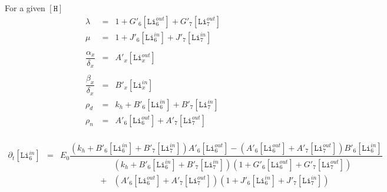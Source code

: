 \documentclass[aps,onecolumn,11pt]{revtex4}
\newcommand{\mychem}[1]{\mathtt{#1}}
\newcommand{\myconc}[1]{\left\lbrack{#1}\right\rbrack}
\newcommand{\LiIn}[1]{\myconc{\mychem{Li}_{#1}^{in}}}
\newcommand{\LiOut}[1]{\myconc{\mychem{Li}_{#1}^{out}}}
\newcommand{\Hin}{\myconc{\mychem{H}}}
\begin{document}
For a given $\Hin$
\begin{equation}
	\begin{array}{rcl}
	\lambda & = & 1 + G'_6 \LiOut{6} + G'_7 \LiOut{7} \\
	\mu     & = & 1 + J'_6 \LiIn{6} + J'_7 \LiIn{7} \\
	\\
	\dfrac{\alpha_x}{\delta_x} & = & A'_x \LiOut{x}\\
	\\
	\dfrac{\beta_x}{\delta_x}  & = & B'_x \LiIn{x}\\
	\rho_d & = & k_h + B'_6 \LiIn{6} + B'_7 \LiIn{7}\\
	\rho_n & = & A'_6 \LiOut{6} + A'_7 \LiOut{7}\\
	\end{array}
\end{equation}

\begin{equation}
	\begin{array}{rcl}
	\partial_t \LiIn{6} & = &E_0
	\dfrac{
	 \left(k_h + B'_6 \LiIn{6} + B'_7 \LiIn{7}\right) A'_6 \LiOut{6}
	 -\left(A'_6 \LiOut{6} + A'_7 \LiOut{7}\right) B'_6 \LiIn{6}
	}
	{
	\begin{array}{cl}
	&\left(k_h + B'_6 \LiIn{6} + B'_7 \LiIn{7}\right) \left(1 + G'_6 \LiOut{6} + G'_7 \LiOut{7}\right)\\
	+&\left(A'_6 \LiOut{6} + A'_7 \LiOut{7}\right)\left(1 + J'_6 \LiIn{6} + J'_7 \LiIn{7}\right)\\
	\end{array}
	}
	
	\\
	\end{array}
\end{equation}
\end{document}
